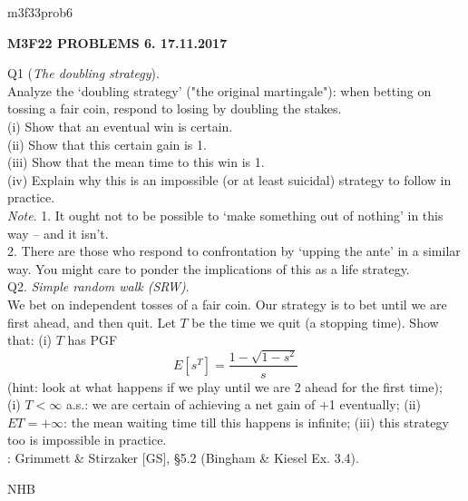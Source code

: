 \documentclass[12pt]{article}
\begin{document}
\def\R{\mathbb{R}}
\def\C{\mathbb{C}}
\def\Z{\mathbb{Z}}
\def\N{\mathbb{N}}
\def\Q{\mathbb{Q}}
\def\D{\mathbb{D}}
\def\Sp{{\mathbb{S}}}
\def\T{\mathbb{T}}
\def\H{\mathbb{H}}
\def\hb{\hfil \break}
\def\ni{\noindent}
\def\i{\indent}
\def\a{\alpha}
\def\b{\beta}
\def\e{\epsilon}
\def\d{\delta}
\def\D{\Delta}
\def\G{\Gamma}
\def\g{\gamma}
\def\l{\lambda}
\def\m{\mu}
\def\s{\sigma}
\def\Si{\Sigma}
\def\th{\theta}
\def\z{\zeta}
\def\p{\partial}
\def\o{\omega}
\def\O{\Omega}
\def\t{\tau}
\def\L{\it \char'44}
\def\F{\mathcal{F}}
\def\B{\mathcal{B}}
\def\C{\mathcal{C}}
\def\half{\frac{1}{2}}
\ni m3f33prob6 \\
\begin{center}
{\bf M3F22 PROBLEMS 6.  17.11.2017} 
\end{center} 

\ni Q1 ({\it The doubling strategy}). \\
\i Analyze the `doubling strategy' ("the original martingale"): when betting on tossing a fair coin, respond to losing
by doubling the stakes. \\
(i) Show that an eventual win is certain. \\
(ii) Show that this certain gain is 1. \\
(iii) Show that the mean time to this win is 1. \\
(iv) Explain why this is an impossible (or at least suicidal) strategy to follow in practice. \\
{\it Note}.  1.  It ought not to be possible to `make something out of nothing' in this way -- and it isn't. \\
2.  There are those who respond to confrontation by `upping the ante' in a similar way.  You might care to ponder the implications of this as a life strategy. \\

\ni Q2. {\it Simple random walk (SRW)}.\\
\i  We bet on independent tosses of a fair coin.  Our strategy is to bet until we are first
ahead, and then quit.  Let $T$ be the time we quit (a stopping time).  Show that: \hb
(i) $T$ has PGF
$$
E[s^{T}] = \frac{1 - \sqrt{1 - s^2}}{s}
$$
(hint: look at what happens if we play until we are 2 ahead for the first time); \\
(i) $T < \infty$ a.s.: we are certain of achieving a net gain of +1 eventually; \hb
(ii) $ET = +\infty$: the mean waiting time till this happens is infinite; \hb
(iii) this strategy too is impossible in practice. \\

\ni{\it Recommended Reading}: Grimmett \& Stirzaker [GS], \S 5.2 (Bingham \& Kiesel Ex. 3.4).

\hfil NHB \break
\end{document}
